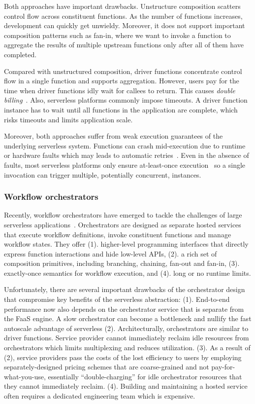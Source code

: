 Both approaches have important drawbacks. Unstructure composition scatters
control flow across constituent functions. As the number of functions
increases, development can quickly get unwieldy. Moreover, it does not support
important composition patterns such as fan-in, where we want to invoke a
function to aggregate the results of multiple upstream functions only after
all of them have completed.

Compared with unstructured composition, driver functions concentrate control
flow in a single function and supports aggregation. However, users pay for the
time when driver functions idly wait for callees to return. This causes
\emph{double billing}~\cite{double-billing}. Also, serverless platforms
commonly impose timeouts. A driver function instance has to wait until all
functions in the application are complete, which risks timeouts and limits
application scale.

Moreover, both approaches suffer from weak execution guarantees of the
underlying serverless system. Functions can crash mid-execution due to runtime
or hardware faults which may leads to automatic retries~\cite{}. Even in the
absence of faults, most serverless platforms only ensure at-least-once
execution~\cite{} so a single invocation can trigger multiple, potentially
concurrent, instances.

\subsubsection{Workflow orchestrators}

Recently, workflow orchestrators have emerged to tackle the challenges of
large serverless applications~\cite{excamera, gg-atc, aws-step-functions,
google-cloud-composer, google-workflows, durable-functions}. Orchestrators are
designed as separate hosted services that execute workflow definitions, invoke
constituent functions and manage workflow states. They offer (1). higher-level
programming interfaces that directly express function interactions and hide
low-level APIs, (2). a rich set of composition primitives, including
branching, chaining, fan-out and fan-in, (3). exactly-once semantics for
workflow execution, and (4). long or no runtime limits.

Unfortunately, there are several important drawbacks of the orchestrator
design that compromise key benefits of the serverless abstraction: (1).
End-to-end performance now also depends on the orchestrator service that is
separate from the FaaS engine. A slow orchestrator can become a bottleneck and
nullify the fast autoscale advantage of serverless (2). Architecturally,
orchestrators are similar to driver functions. Service provider cannot
immediately reclaim idle resources from orchestrators which limits
multiplexing and reduces utilization. (3). As a result of (2), service
providers pass the costs of the lost efficiency to users by employing
separately-designed pricing schemes that are coarse-grained and not
pay-for-what-you-use, essentially ``double-charging'' for idle orchestrator
resources that they cannot immediately reclaim. (4). Building and maintaining
a hosted service often requires a dedicated engineering team which is
expensive.

